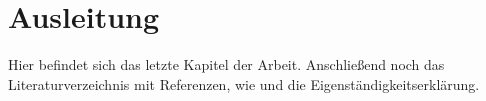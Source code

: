 %
\section{Ausleitung}\label{sec:Ausleitung}
%
Hier befindet sich das letzte Kapitel der Arbeit.
Anschließend noch das Literaturverzeichnis mit Referenzen, wie \cite{tur38} und die Eigenständigkeitserklärung.
%
